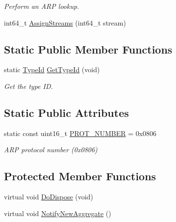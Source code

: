 \begin{DoxyCompactItemize}
\begin{DoxyCompactList}\small\item\em Perform an A\+RP lookup. \end{DoxyCompactList}\item 
int64\+\_\+t \hyperlink{classns3_1_1ArpL3Protocol_a07ef806847944cc7a463e2db33d59681}{Assign\+Streams} (int64\+\_\+t stream)
\end{DoxyCompactItemize}
\subsection*{Static Public Member Functions}
\begin{DoxyCompactItemize}
\item 
static \hyperlink{classns3_1_1TypeId}{Type\+Id} \hyperlink{classns3_1_1ArpL3Protocol_a2733879f637c220b7876ff5edaaefcdf}{Get\+Type\+Id} (void)
\begin{DoxyCompactList}\small\item\em Get the type ID. \end{DoxyCompactList}\end{DoxyCompactItemize}
\subsection*{Static Public Attributes}
\begin{DoxyCompactItemize}
\item 
static const uint16\+\_\+t \hyperlink{classns3_1_1ArpL3Protocol_a836aec5bc5e5a8ea1d7f46609dc9cc2c}{P\+R\+O\+T\+\_\+\+N\+U\+M\+B\+ER} = 0x0806
\begin{DoxyCompactList}\small\item\em A\+RP protocol number (0x0806) \end{DoxyCompactList}\end{DoxyCompactItemize}
\subsection*{Protected Member Functions}
\begin{DoxyCompactItemize}
\item 
virtual void \hyperlink{classns3_1_1ArpL3Protocol_a090a5c1267fc1008cdefbca6473e5316}{Do\+Dispose} (void)
\item 
virtual void \hyperlink{classns3_1_1ArpL3Protocol_a6c0bd0b14a514f5abd0b0eff34020283}{Notify\+New\+Aggregate} ()
\end{DoxyCompactItemize}
